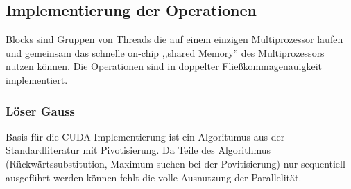 \documentclass[journal]{IEEEtran}
\begin{document}
\subsection{Implementierung der Operationen}

Blocks sind Gruppen von Threads die auf einem einzigen Multiprozessor laufen
und gemeinsam das schnelle on-chip ,,shared Memory''
des Multiprozessors nutzen können. \cite{cudapg}
Die Operationen sind in doppelter Fließkommagenauigkeit implementiert.







\subsubsection{Löser Gauss}
Basis für die CUDA Implementierung ist ein Algoritumus aus der
Standardliteratur \cite{sedgewick} mit Pivotisierung.
Da Teile des Algorithmus (Rückwärtssubstitution, Maximum suchen bei der
Povitisierung) nur sequentiell ausgeführt werden können fehlt die volle
Ausnutzung der Parallelität.

%
%

\end{document}
